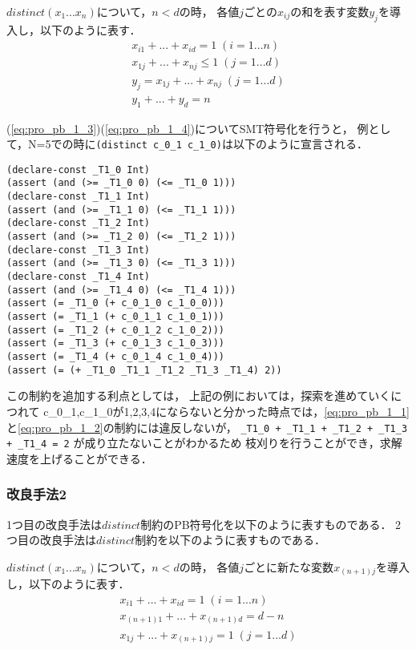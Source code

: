 $distinct(x_1 ... x_n)$について，$n < d$の時，
各値$j$ごとの$x_{ij}$の和を表す変数$y_j$を導入し，以下のように表す．
\begin{eqnarray}
    x_{i1} + ... + x_{id}=1 \; (i=1 ... n) \label{eq:pro_pb_1_1}\\
    x_{1j} + ... + x_{nj}\leq1 \; (j=1 ... d) \label{eq:pro_pb_1_2}\\
    y_j = x_{1j} + ... + x_{nj} \; (j=1 ... d) \label{eq:pro_pb_1_3}\\
    y_1 + ... + y_d =n \label{eq:pro_pb_1_4}
\end{eqnarray}

(\ref{eq:pro_pb_1_3})(\ref{eq:pro_pb_1_4})についてSMT符号化を行うと，
例として，N=5での時に\verb|(distinct c_0_1 c_1_0)|は以下のように宣言される．

{ \scriptsize \begin{verbatim}
(declare-const _T1_0 Int)
(assert (and (>= _T1_0 0) (<= _T1_0 1)))
(declare-const _T1_1 Int)
(assert (and (>= _T1_1 0) (<= _T1_1 1)))
(declare-const _T1_2 Int)
(assert (and (>= _T1_2 0) (<= _T1_2 1)))
(declare-const _T1_3 Int)
(assert (and (>= _T1_3 0) (<= _T1_3 1)))
(declare-const _T1_4 Int)
(assert (and (>= _T1_4 0) (<= _T1_4 1)))
(assert (= _T1_0 (+ c_0_1_0 c_1_0_0)))
(assert (= _T1_1 (+ c_0_1_1 c_1_0_1)))
(assert (= _T1_2 (+ c_0_1_2 c_1_0_2)))
(assert (= _T1_3 (+ c_0_1_3 c_1_0_3)))
(assert (= _T1_4 (+ c_0_1_4 c_1_0_4)))
(assert (= (+ _T1_0 _T1_1 _T1_2 _T1_3 _T1_4) 2))
\end{verbatim}}

この制約を追加する利点としては，
上記の例においては，探索を進めていくにつれて
c\_0\_1,c\_1\_0が1,2,3,4にならないと分かった時点では，\ref{eq:pro_pb_1_1}と\ref{eq:pro_pb_1_2}の制約には違反しないが，
{\small \verb|_T1_0 + _T1_1 + _T1_2 + _T1_3 + _T1_4 = 2| }が成り立たないことがわかるため
枝刈りを行うことができ，求解速度を上げることができる．

\subsubsection{改良手法2}\label{sec:pro_hint_3_2}
1つ目の改良手法は$distinct$制約のPB符号化を以下のように表すものである．
2つ目の改良手法は$distinct$制約を以下のように表すものである．

$distinct(x_1 ... x_n)$について，$n < d$の時，
各値$j$ごとに新たな変数$x_{(n+1)j}$を導入し，以下のように表す．
\begin{eqnarray}
    x_{i1} + ... + x_{id}=1 \; (i=1 ... n) \label{eq:pro_pb_2_1}\\
    x_{(n+1)1} + ... + x_{(n+1)d}=d-n \label{eq:pro_pb_2_2}\\
    x_{1j} + ... + x_{(n+1)j}=1 \; (j=1 ... d) \label{eq:pro_pb_2_3}\\
\end{eqnarray}

